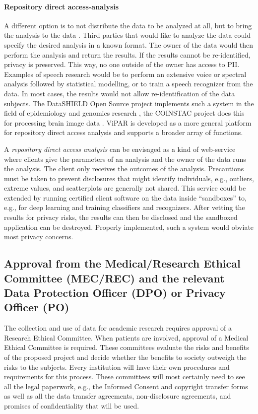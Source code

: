 \documentclass[10pt, a4paper]{article}
\begin{document}
\paragraph{Repository direct access-analysis} A different option is to not distribute the data to be analyzed at all, but to bring the analysis to the data \cite{budin2015datashield}. Third parties that would like to analyze the data could specify the desired analysis in a known format. The owner of the data would then perform the analysis and return the results. If the results cannot be re-identified, privacy is preserved. This way, no one outside of the owner has access to PII. Examples of speech research would be to perform an extensive voice or spectral analysis followed by statistical modelling, or to train a speech recognizer from the data. In most cases, the results would not allow re-identification of the data subjects. The DataSHIELD Open Source project implements such a system in the field of epidemiology and genomics research \cite{DataSHIELD,DataSHIELD2014,wilson2017datashield,budin2015datashield}, the COINSTAC project does this for processing brain image data \cite{plis2016coinstac}. ViPAR \cite{carter2016vipar} is developed as a more general platform for repository direct access analysis and supports a broader array of functions.

A {\em repository direct access analysis} can be envisaged as a kind of web-service where clients give the parameters of an analysis and the owner of the data runs the analysis. The client only receives the outcomes of the analysis. Precautions must be taken to prevent disclosures that might identify individuals, e.g., outliers, extreme values, and scatterplots are generally not shared. This service could be extended by running certified client software on the data inside ``sandboxes'' to, e.g., for deep learning and training classifiers and recognizers. After vetting the results for privacy risks, the results can then be disclosed and the sandboxed application can be destroyed. Properly implemented, such a system would obviate most privacy concerns.

\subsection{Approval from the Medical/Research Ethical Committee (MEC/REC) and the relevant Data Protection Officer (DPO) or Privacy Officer (PO)}

The collection and use of data for academic research requires approval of a Research Ethical Committee. When patients are involved, approval of a Medical Ethical Committee is required. These committees evaluate the risks and benefits of the proposed project and decide whether the benefits to society outweigh the risks to the subjects. Every institution will have their own procedures and requirements for this process. These committees will most certainly need to see all the legal paperwork, e.g., the Informed Consent and copyright transfer forms as well as all the data transfer agreements, non-disclosure agreements, and promises of confidentiality that will be used.
\end{document}
